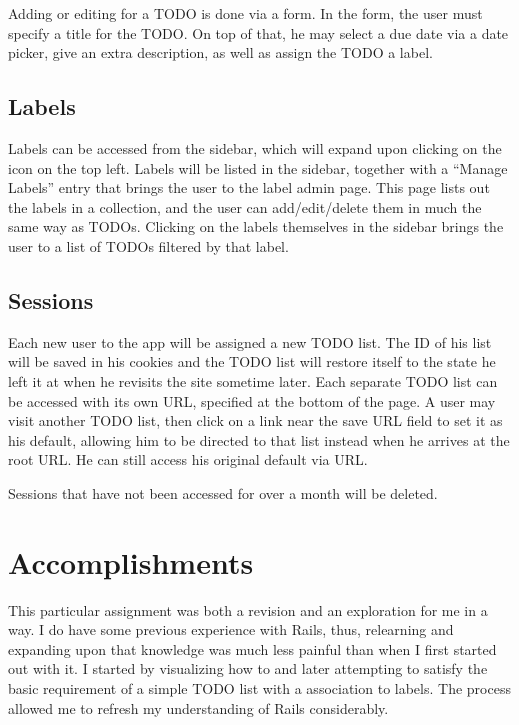 \documentclass[12pt, notitlepage]{article}
\begin{document}
Adding or editing for a TODO is done via a form. In the form, the user must specify a title for the TODO\@. On top of that, he may select a due date via a date picker, give an extra description, as well as assign the TODO a label.

\subsection*{Labels}

Labels can be accessed from the sidebar, which will expand upon clicking on the icon on the top left. Labels will be listed in the sidebar, together with a ``Manage Labels'' entry that brings the user to the label admin page. This page lists out the labels in a collection, and the user can add/edit/delete them in much the same way as TODOs. Clicking on the labels themselves in the sidebar brings the user to a list of TODOs filtered by that label.

\subsection*{Sessions}

Each new user to the app will be assigned a new TODO list. The ID of his list will be saved in his cookies and the TODO list will restore itself to the state he left it at when he revisits the site sometime later. Each separate TODO list can be accessed with its own URL, specified at the bottom of the page. A user may visit another TODO list, then click on a link near the save URL field to set it as his default, allowing him to be directed to that list instead when he arrives at the root
URL\@. He can still access his original default via URL\@.

Sessions that have not been accessed for over a month will be deleted.

\section*{Accomplishments}

This particular assignment was both a revision and an exploration for me in a way. I do have some previous experience with Rails, thus, relearning and expanding upon that knowledge was much less painful than when I first started out with it. I started by visualizing how to and later attempting to satisfy the basic requirement of a simple TODO list with a association to labels. The process allowed me to refresh my understanding of Rails considerably.
\end{document}
